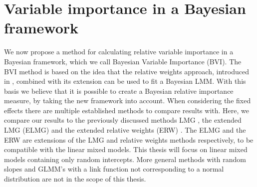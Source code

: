 \section{Variable importance in a Bayesian framework}
\label{sec:implementation}
We now propose a method for calculating relative variable importance in a Bayesian framework, which we call Bayesian Variable Importance (BVI). 
The BVI method is based on the idea that the relative weights approach, introduced in , combined with its extension \citep{matre} can be used to fit a Bayesian LMM.
With this basis we believe that it is possible to create a Bayesian relative importance measure, by taking the new framework into account.
When considering the fixed effects there are multiple established methods to compare results with. Here, we compare our results to the previously discussed methods LMG \citep{gromping_relaimpo}, the extended LMG (ELMG) and the extended relative weights (ERW) \citep{matre}.
The ELMG and the ERW are extensions of the LMG and relative weights methods respectively, to be compatible with the linear mixed models.
This thesis will focus on linear mixed models containing only random intercepts. 
More general methods with random slopes and GLMM's with a link function not corresponding to a normal distribution are not in the scope of this thesis.

